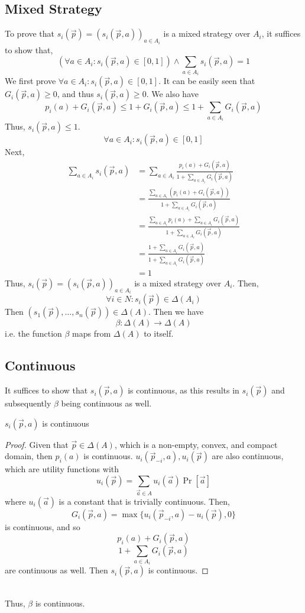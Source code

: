 \newpage
\subsection{Mixed Strategy}

To prove that $s_i(\vec{p}) = (s_i(\vec{p},a))_{a\in A_i}$
is a mixed strategy over $A_i$, it suffices to show that,
\[(\forall a\in A_i : s_i(\vec{p},a)\in[0,1]) \wedge 
\sum_{a\in A_i} s_i(\vec{p},a)=1\]
We first prove $\forall a\in A_i : s_i(\vec{p},a)\in[0,1]$.
It can be easily seen that $G_i(\vec{p},a) \geq 0$,
and thus $s_i(\vec{p},a)\geq 0$. We also have
\[p_i(a)+G_i(\vec{p},a) \leq 1 +G_i(\vec{p},a) 
\leq 1 +\sum_{a\in A_i} G_i(\vec{p},a)\]
Thus, $s_i(\vec{p},a)\leq 1$. 
\[\forall a\in A_i : s_i(\vec{p},a)\in[0,1]\]
Next,
\begin{equation}
\begin{aligned}
    \sum_{a\in A_i} s_i(\vec{p},a) 
    &= \sum_{a\in A_i} 
    \frac{p_i(a)+G_i(\vec{p},a)}{1 +\sum_{a\in A_i} G_i(\vec{p},a)}\\
    &= \frac{\sum_{a\in A_i} \left(p_i(a)+G_i(\vec{p},a)\right)}
    {1 +\sum_{a\in A_i} G_i(\vec{p},a)}\\
    &= \frac{\sum_{a\in A_i} p_i(a)+\sum_{a\in A_i}G_i(\vec{p},a)}
    {1 +\sum_{a\in A_i} G_i(\vec{p},a)}\\
    &= \frac{1 +\sum_{a\in A_i} G_i(\vec{p},a)}
    {1 +\sum_{a\in A_i} G_i(\vec{p},a)}\\
    &= 1
\end{aligned}
\end{equation}
Thus, $s_i(\vec{p}) = (s_i(\vec{p},a))_{a\in A_i}$
is a mixed strategy over $A_i$. 
Then, 
\[\forall i\in N:s_i(\vec{p})\in\Delta(A_i)\]
Then $(s_1(\vec{p}),\dots,s_n(\vec{p}))\in\Delta(A)$.
Then we have 
\[\beta : \Delta(A) \rightarrow \Delta(A)\] 
i.e. the function $\beta$ maps from $\Delta(A)$ to itself.


\subsection{Continuous}
It suffices to show that $s_i(\vec{p},a)$ is continuous, as this results in
$s_i(\vec{p})$ and subsequently $\beta$ being continuous as well.
\begin{claim}
    $s_i(\vec{p},a)$ is continuous
\end{claim}
\begin{proof}
    Given that $\vec{p}\in\Delta(A)$, 
    which is a non-empty, convex, and compact domain,
    then $p_i(a)$ is continuous.
    $u_i(\vec{p}_{-i},a),u_i(\vec{p})$ are also continuous, 
    which are utility functions with
    \[u_i(\vec{p})=\sum_{\vec{a}\in A}u_i(\vec{a})\Pr[\vec{a}]\]
    where $u_i(\vec{a})$ is a constant that is trivially continuous.
    Then,
    \[G_i(\vec{p},a)=\max\{u_i(\vec{p}_{-i},a)-u_i(\vec{p}),0\}\]
    is continuous, and so
    \[p_i(a)+G_i(\vec{p},a)\]
    \[1+\sum_{a\in A_i}G_i(\vec{p},a)\]
    are continuous as well. 
    Then $s_i(\vec{p},a)$ is continuous.
\end{proof}\\
Thus, $\beta$ is continuous.

